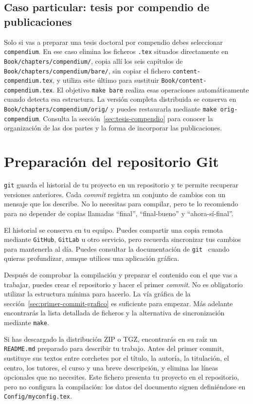 \subsection{Caso particular: tesis por compendio de publicaciones}

Solo si vas a preparar una tesis doctoral por compendio debes seleccionar \texttt{compendium}. En ese caso elimina los ficheros \texttt{.tex} situados directamente en \texttt{Book/chapters/compendium/}, copia allí los seis capítulos de \texttt{Book/chapters/compendium/bare/}, sin copiar el fichero \texttt{content-compendium.tex}, y utiliza este último para sustituir \texttt{Book/content-compendium.tex}. El objetivo \texttt{make bare} realiza esas operaciones automáticamente cuando detecta esa estructura. La versión completa distribuida se conserva en \texttt{Book/chapters/compendium/orig/} y puedes restaurarla mediante \texttt{make orig-compendium}. Consulta la sección~\ref{sec:tesis-compendio} para conocer la organización de las dos partes y la forma de incorporar las publicaciones.

\section{Preparación del repositorio Git}
\label{sec:preparacion-repositorio-git}

\texttt{git} guarda el historial de tu proyecto en un repositorio y te permite recuperar versiones anteriores. Cada \emph{commit} registra un conjunto de cambios con un mensaje que los describe. No lo necesitas para compilar, pero te lo recomiendo para no depender de copias llamadas ``final'', ``final-bueno'' y ``ahora-sí-final''.

El historial se conserva en tu equipo. Puedes compartir una copia remota mediante \texttt{GitHub}, \texttt{GitLab} u otro servicio, pero recuerda sincronizar tus cambios para mantenerla al día. Puedes consultar la documentación de \texttt{git}~\cite{git-manual} cuando quieras profundizar, aunque utilices una aplicación gráfica.

Después de comprobar la compilación y preparar el contenido con el que vas a trabajar, puedes crear el repositorio y hacer el primer \emph{commit}. No es obligatorio utilizar la estructura mínima para hacerlo. La vía gráfica de la sección~\ref{sec:primer-commit-grafico} es suficiente para empezar. Más adelante encontrarás la lista detallada de ficheros y la alternativa de sincronización mediante \texttt{make}.

Si has descargado la distribución ZIP o TGZ, encontrarás en su raíz un \texttt{README.md} preparado para describir tu trabajo. Antes del primer commit, sustituye sus textos entre corchetes por el título, la autoría, la titulación, el centro, los tutores, el curso y una breve descripción, y elimina las líneas opcionales que no necesites. Este fichero presenta tu proyecto en el repositorio, pero no configura la compilación: los datos del documento siguen definiéndose en \texttt{Config/myconfig.tex}.

